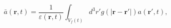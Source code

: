 \begin{equation}
\bar{a}(\mathbf{r},t) = \frac{1}{\varepsilon(\mathbf{r},t)} \int_{V_f(t)}{d^3 r'
g(|\mathbf{r} - \mathbf{r'}|) a(\mathbf{r'},t)},
 \label{eq:a}
\end{equation}
